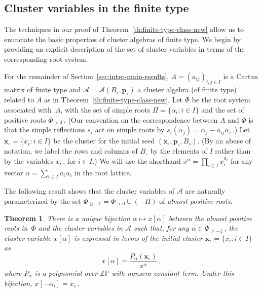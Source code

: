 \documentclass[letterpaper]{amsart}
\numberwithin{equation}{section}
\newtheorem{theorem}{Theorem}[section]
\theoremstyle{definition}
\def\AA{\mathcal{A}}
\def\ZZ{\mathbb{Z}}
\def\PP{\mathbb{P}}
\def\xx{\mathbf{x}}
\def\pp{\mathbf{p}}
\begin{document}
\subsection{Cluster variables in the finite type} 
\label{sec:laurent-finite-type} 
 
The techniques  in our proof of 
Theorem~\ref{th:finite-type-class-new} allow us to 
enunciate the basic properties of cluster algebras of finite type. 
We begin by providing an explicit description of the set of 
cluster variables in terms of the corresponding root system. 
 
For the remainder of Section~\ref{sec:intro-main-results}, 
$A=(a_{ij})_{i,j\in I}$ is a Cartan matrix of finite type 
and $\AA=\AA(B_\circ,\pp_\circ)$ a cluster algebra (of finite type) 
related to $A$ as in Theorem~\ref{th:finite-type-class-new}. 
Let $\Phi$ be the root system associated with~$A$, 
with the set of simple roots $\Pi = \{\alpha_i : i \in I\}$ 
and the set of positive roots $\Phi_{>0}\,$. 
(Our convention on the correspondence 
between $A$ and $\Phi$ is that the simple reflections $s_i$ act on simple roots by 
$s_i (\alpha_j) = \alpha_j - a_{ij} \alpha_i\,$.) 
Let $\xx_\circ = \{x_i : i \in I\}$ be the cluster for the initial 
seed $(\xx_\circ, \pp_\circ, B_\circ)$. 
(By an abuse of notation, we label the rows and columns of $B_\circ$ by the 
elements of $I$ rather than by the variables $x_i\,$, for $i\in I$.) 
We will use the shorthand 
$x^\alpha = \prod_{i \in I} x_i^{a_i}$ 
for any vector $\alpha = \sum_{i \in I} a_i \alpha_i$ in the root lattice. 
 
The following result shows that the cluster variables of $\AA$ are naturally parameterized 
by the set $\Phi_{\geq -1} = \Phi_{> 0} \cup (- \Pi)$ of 
\emph{almost positive roots}. 
 
\begin{theorem} 
\label{th:cluster-variable-denominators-1} 
There is a unique bijection 
$\alpha\mapsto x[\alpha]$ 
between the almost positive roots in~$\Phi$ 
and the cluster variables in %
$\AA$ 
such that, for any $\alpha\in\Phi_{\geq -1}\,$, 
the cluster variable $x[\alpha]$ is expressed in terms of the initial 
cluster $\xx_\circ = \{x_i : i \in I\}$ as 
\begin{equation} 
\label{eq:laurent-finite-type} 
x[\alpha]=\frac{P_\alpha (\xx_\circ)}{x^\alpha} 
\,, 
\end{equation} 
where $P_\alpha$ is a polynomial over $\ZZ\PP$ with nonzero constant term. 
Under this bijection, $x[-\alpha_i]=x_i\,$. 
\end{theorem} 
 
\end{document}
